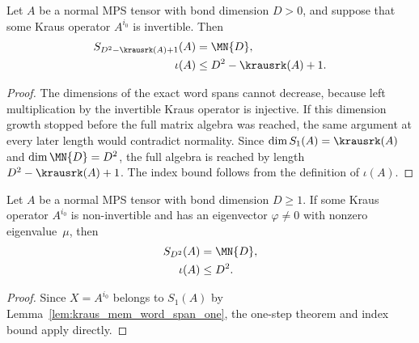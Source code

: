 \begin{lemma}%
    \label{thm:wielandt_case2_normal_generator}
    \leanok
    Let $A$ be a normal MPS tensor with bond dimension $D>0$, and suppose
    that some Kraus operator $A^{i_0}$ is invertible. Then
    \begin{align}
        S_{D^2-\krausrk(A)+1}(A)
         & =\MN{D},
        \notag                    \\
        \iota(A)
         & \le D^2-\krausrk(A)+1.
        \notag
    \end{align}
\end{lemma}

\begin{proof}
    \leanok
    The dimensions of the exact word spans cannot decrease, because
    left multiplication by the invertible Kraus operator is injective.
    If this dimension growth stopped before the full matrix algebra was
    reached, the same argument at every later length would contradict
    normality. Since $\dim S_1(A)=\krausrk(A)$ and
    $\dim\MN{D}=D^2$, the full algebra is reached by length
    $D^2-\krausrk(A)+1$. The index bound follows from the definition
    of $\iota(A)$.
\end{proof}

\begin{lemma}%
    \label{cor:wielandt_case3_generator}
    \leanok
    Let $A$ be a normal MPS tensor with bond dimension $D\ge1$.
    If some Kraus operator $A^{i_0}$ is non-invertible and has an
    eigenvector $\varphi\neq0$ with nonzero eigenvalue~$\mu$, then
    \begin{align}
        S_{D^2}(A)
         & =\MN{D},
        \notag      \\
        \iota(A)
         & \le D^2.
        \notag
    \end{align}
\end{lemma}

\begin{proof}
    \leanok
    Since $X=A^{i_0}$ belongs to $S_1(A)$ by
    Lemma~\ref{lem:kraus_mem_word_span_one}, the one-step theorem and index
    bound apply directly.
\end{proof}

